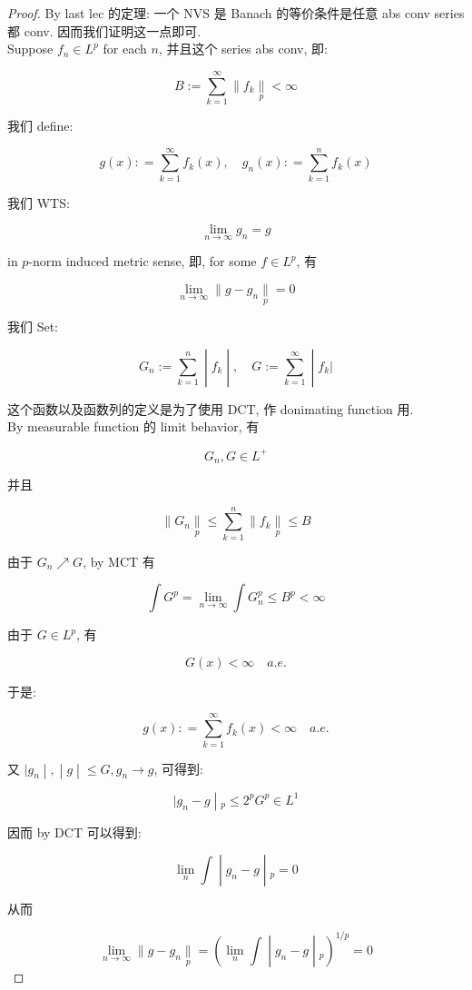 \begin{proof}

By last lec 的定理: 一个 NVS 是 Banach 的等价条件是任意 abs conv series 都 conv. 因而我们证明这一点即可.\\
Suppose \(f_{n} \in L^{p}\) for each \(n\), 并且这个 series abs conv, 即:

\[B := \sum\limits_{k = 1}^{\infty} \parallel f_{k}\underset{p}{\parallel} < \infty\]

我们 define:

\[g(x): = \sum\limits_{k = 1}^{\infty}f_{k}(x),\quad g_{n}(x): = \sum\limits_{k = 1}^{n}f_{k}(x)\]

我们 WTS:

\[\lim\limits_{n\rightarrow\infty}g_{n} = g\]

in \(p\)-norm induced metric sense, 即, for some \(f \in L^{p}\), 有

\[\lim\limits_{n\rightarrow\infty} \parallel g - g_{n}\underset{p}{\parallel} = 0\]

我们 Set:

\[\left. G_{n} := \sum\limits_{k = 1}^{n} \middle| f_{k} \middle| ,\quad G := \sum\limits_{k = 1}^{\infty} \middle| f_{k}| \right.\]

这个函数以及函数列的定义是为了使用 DCT, 作 donimating function 用.\\
By measurable function 的 limit behavior, 有

\[G_{n},G \in L^{+}\]

并且

\[\parallel G_{n}\underset{p}{\parallel} \leq \sum\limits_{k = 1}^{n} \parallel f_{k}\underset{p}{\parallel} \leq B\]

由于 \(G_{n}\operatorname{\nearrow }G\), by MCT 有

\[\int G^{p} = \lim\limits_{n\rightarrow\infty}\int G_{n}^{p} \leq B^{p} < \infty\]

由于 \(G \in L^{p}\), 有

\[G(x) < \infty\quad a.e.\]

于是:

\[g(x): = \sum\limits_{k = 1}^{\infty}f_{k}(x) < \infty\quad a.e.\]

又 \(\left. |g_{n} \middle| , \middle| g \middle| \leq G,g_{n}\rightarrow g \right.\), 可得到:

\[\left. |g_{n} - g \middle| {}_{p} \leq 2^{p}G^{p} \in L^{1} \right.\]

因而 by DCT 可以得到:

\[\left. \lim\limits_{n}\int \middle| g_{n} - g \middle| {}_{p} = 0 \right.\]

从而

\[\left. \lim\limits_{n\rightarrow\infty} \parallel g - g_{n}\underset{p}{\parallel} = (\lim\limits_{n}\int \middle| g_{n} - g \middle| {}_{p})^{1/p} = 0 \right.\]

\end{proof}

